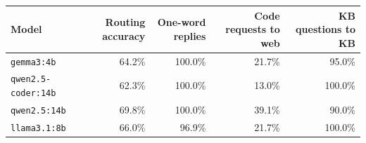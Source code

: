 \begin{tabular}{lrrrr}
\hline
Model & Routing accuracy & One-word replies & Code requests to web & KB questions to KB \\
\hline
\texttt{gemma3:4b} & 64.2\% & 100.0\% & 21.7\% & 95.0\% \\
\texttt{qwen2.5-coder:14b} & 62.3\% & 100.0\% & 13.0\% & 100.0\% \\
\texttt{qwen2.5:14b} & 69.8\% & 100.0\% & 39.1\% & 90.0\% \\
\texttt{llama3.1:8b} & 66.0\% & 96.9\% & 21.7\% & 100.0\% \\
\hline
\end{tabular}
